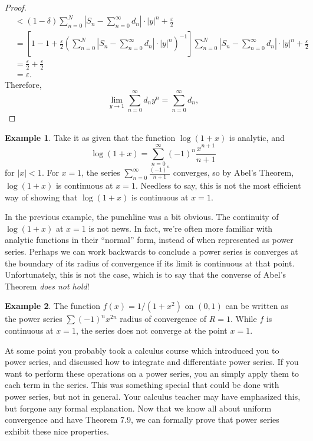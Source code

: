 \documentclass{article}
\theoremstyle{definition}
\newtheorem{example}{Example}[section]
\begin{document}
\begin{proof}
\begin{align*}
		&< (1-\delta)\sum_{n=0}^{N}\left\lvert S_n-\sum_{n=0}^{\infty}d_n \right\rvert\cdot|y|^n + \frac{\varepsilon}{2}\\
		& = \left[1-1 + \frac{\varepsilon}{2}\left(\sum_{n=0}^{N}\left\lvert S_n-\sum_{n=0}^{\infty}d_n \right\rvert\cdot|y|^n\right)^{-1}\right]\sum_{n=0}^{N}\left\lvert S_n-\sum_{n=0}^{\infty}d_n \right\rvert\cdot|y|^n + \frac{\varepsilon}{2}\\ & = 
		\frac{\varepsilon}{2} + \frac{\varepsilon}{2}\\
		& = \varepsilon.
	\end{align*}
	Therefore, $$ \lim\limits_{y\to 1}\sum_{n=0}^{\infty}d_ny^n= \sum_{n=0}^{\infty}d_n,$$
	\end{proof}

\begin{example}
	Take it as given that the function $ \log(1+x) $ is analytic, and $$ \log(1+x)=\sum_{n=0}^{\infty}(-1)^{n}\frac{x^{n+1}}{n+1}$$ for $ |x|<1 $. For $ x=1 $,  the series $\sum_{n=0}^{\infty}\frac{(-1)^{n}}{n+1}$ converges, so by Abel's Theorem, $ \log(1+x) $ is continuous at $ x = 1 $. Needless to say, this is not the most efficient way of showing that $ \log(1+x) $ is continuous at $ x = 1 $.   
\end{example}

In the previous example, the punchline was a bit obvious. The continuity of $ \log(1+x) $ at $ x = 1 $ is not news. In fact, we're often more familiar with analytic functions in their ``normal'' form, instead of when represented as power series. Perhaps we can work backwards to conclude a power series is converges at the boundary of its radius of convergence if its limit is continuous at that point. Unfortunately, this is not the case, which is to say that the converse of Abel's Theorem \textit{does not hold}! 

\begin{example}
	The function $ f(x)= 1/(1+x^2) $ on $ (0,1) $ can be written as the power series $ \sum(-1)^nx^{2n}$ radius of convergence of $ R = 1 $. While $ f $ is continuous at $ x = 1 $, the series does not converge at the point $ x = 1 $.
\end{example}

At some point you probably took a calculus course which introduced you to power series, and discussed how to integrate and differentiate power series. If you want to perform these operations on a power series, you an simply apply them to each term in the series. This was something special that could be done with power series, but not in general. Your calculus teacher may have emphasized this, but forgone any formal explanation. Now that we know all about uniform convergence and have Theorem 7.9, we can formally prove that power series exhibit these nice properties.  
\end{document}
